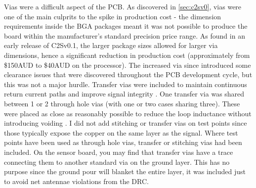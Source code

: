 Vias were a difficult aspect of the PCB. As discovered in \autoref{sec:c2sv0}, vias were one of the main culprits to the spike in production cost - the dimension requirements inside the BGA packages meant it was not possible to produce the board within the manufacturer's standard precision price range. As found in an early release of C2Sv0.1, the larger package sizes allowed for larger via dimensions, hence a significant reduction in production cost (approximately from \$150AUD to \$40AUD on the processor).
The increased via since introduced some clearance issues that were discovered throughout the PCB development cycle, but this was not a major hurdle.
\nl
Transfer vias were included to maintain continuous return current paths and improve signal integrity \cite{EEVblogImportanceTransferVias}. One transfer via was shared between 1 or 2 through hole vias (with one or two cases sharing three). These were placed as close as reasonably possible to reduce the loop inductance without introducing voiding \cite{Peterson2022StitchingViasAltium}.
\nl
I did not add stitching or transfer vias on test points since those typically expose the copper on the same layer as the signal. Where test points have been used as through hole vias, transfer or stitching vias had been included.
\nl
On the sensor board, you may find that transfer vias have a trace connecting them to another standard via on the ground layer. This has no purpose since the ground pour will blanket the entire layer, it was included just to avoid net antennae violations from the DRC.